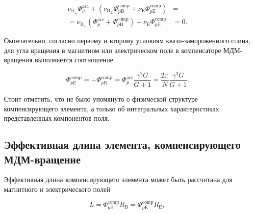  \begin{equation}
	\begin{aligned}
		\nu_{\mathrm{B}_{\perp}}\Phi_{p}^{\text{arc}} +
		\left(\nu_{\mathrm{B}_{\perp}}\Phi_{p\mathrm{B}}^{\text{comp}} +
		\nu_{\mathrm{E}}\Phi_{p\mathrm{E}}^{\text{comp}} \right) & = \\
		= \nu_{\mathrm{B}_{\perp}} \left( 
		\Phi_{p}^{\text{arc}} +
		\Phi_{p\mathrm{B}}^{\text{comp}} \right) +
		\nu_{\mathrm{E}}\Phi_{p\mathrm{E}}^{\text{comp}}  & = 0.
		\label{eq:deflection}
	\end{aligned}
\end{equation}

\noindent Окончательно, согласно первому и второму условиям квази-замороженного спина, для угла вращения в магнитном или электрическом поле в компенсаторе МДМ-вращения выполняется соотношение

\begin{equation}
	\Phi_{p\mathrm{E}}^{\textrm{comp}} = - \Phi_{p\mathrm{B}}^{\textrm{comp}} = {\Phi}_{p}^{\text{arc}}\frac{\gamma^2 G}{G+1} =\frac{2\pi}{N}\frac{\gamma^2 G}{G+1}.
	\label{eq:deflection}
\end{equation}

\noindent Стоит отметить, что не было упомянуто о физической структуре компенсирующего элемента, а только об интегральных характеристиках представленных компонентов поля.

	\subsection{Эффективная длина элемента, компенсирующего МДМ-вращение}\label{sec:EDM/requirements/length}
	
\par Эффективная длина компенсирующего элемента может быть рассчитана для магнитного и электрического полей

\begin{equation}
	L = \Phi_{p\mathrm{B}}^{\text{comp}}R_{\mathrm{B}} = \Phi_{p\mathrm{E}}^{\text{comp}}R_{\mathrm{E}},
	\label{eq:length}
\end{equation}


